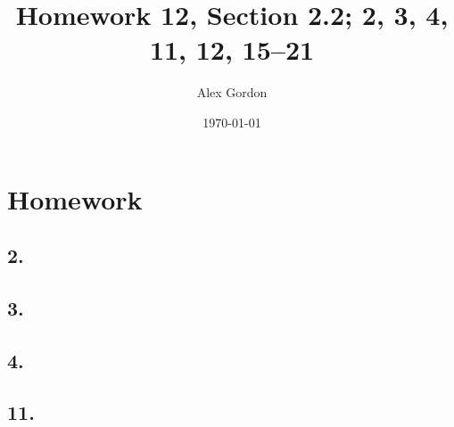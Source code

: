 \documentclass[12]{scrartcl}
\begin{document}
\title{Homework 12, Section 2.2; 2, 3, 4, 11, 12, 15–21
}
\author{Alex Gordon}
\date{\today}
\maketitle
\section*{Homework}
\subsection*{2.}
\subsection*{3.}
\subsection*{4.}
\subsection*{11.}
\end{document}
